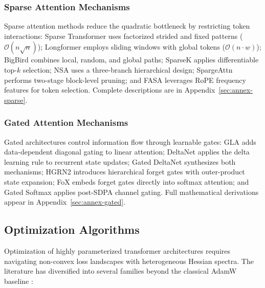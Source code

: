 \documentclass[11pt,a4paper]{article}
\begin{document}
\subsubsection{Sparse Attention Mechanisms}
Sparse attention methods reduce the quadratic bottleneck by restricting token interactions: Sparse Transformer \citep{child_sparse_transformer_2019} uses factorized strided and fixed patterns ($\mathcal{O}(n\sqrt{n})$); Longformer \citep{beltagy_longformer_2020} employs sliding windows with global tokens ($\mathcal{O}(n \cdot w)$); BigBird \citep{zaheer_bigbird_2020} combines local, random, and global paths; SparseK \citep{lou_sparsek_2024} applies differentiable top-$k$ selection; NSA \citep{yuan_nsa_2025} uses a three-branch hierarchical design; SpargeAttn \citep{zhang_spargeattn_2025} performs two-stage block-level pruning; and FASA \citep{wang_fasa_2026} leverages RoPE frequency features for token selection. Complete descriptions are in Appendix~\ref{sec:annex-sparse}.

\subsubsection{Gated Attention Mechanisms}
Gated architectures control information flow through learnable gates: GLA \citep{yang_gla_2023} adds data-dependent diagonal gating to linear attention; DeltaNet \citep{yang_deltanet_2024} applies the delta learning rule to recurrent state updates; Gated DeltaNet \citep{yang_gated_deltanet_2024} synthesizes both mechanisms; HGRN2 \citep{qin_hgrn2_2024} introduces hierarchical forget gates with outer-product state expansion; FoX \citep{lin_forgetting_transformer_2025} embeds forget gates directly into softmax attention; and Gated Softmax \citep{qiu_gated_attention_2025} applies post-SDPA channel gating. Full mathematical derivations appear in Appendix~\ref{sec:annex-gated}.

\subsection{Optimization Algorithms}

Optimization of highly parameterized transformer architectures requires navigating non-convex loss landscapes with heterogeneous Hessian spectra. The literature has diversified into several families beyond the classical AdamW baseline \citep{loshchilov_decoupled_2017}:
\end{document}

